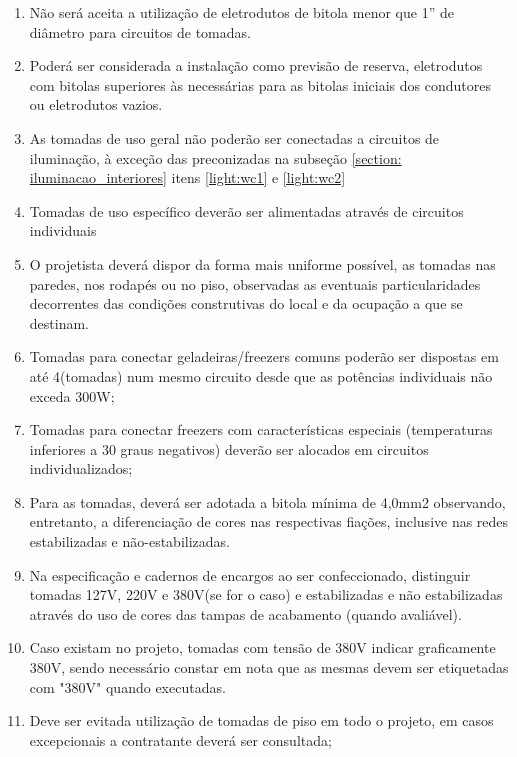 \begin{enumerate}
	\item Não será aceita a utilização de eletrodutos de bitola menor que 1” de diâmetro para circuitos de tomadas.
	
	\item Poderá ser considerada a instalação como previsão de reserva, eletrodutos com bitolas superiores às necessárias para as bitolas iniciais dos condutores ou eletrodutos vazios.
	
	\item As tomadas de uso geral não poderão ser conectadas a circuitos de iluminação, à exceção das preconizadas na subseção \ref{section: iluminacao_interiores} itens \ref*{light:wc1} e \ref*{light:wc2}
	 
	\item Tomadas de uso específico deverão ser alimentadas através de circuitos individuais
	
	\item O projetista deverá dispor da forma mais uniforme possível, as tomadas nas paredes, nos rodapés ou no piso, observadas as eventuais particularidades decorrentes das condições construtivas do local e da ocupação a que se destinam.

	\item Tomadas para conectar geladeiras/freezers comuns poderão ser dispostas em até 4(tomadas) num mesmo circuito desde que as potências individuais não exceda 300W;
	
	\item Tomadas para conectar freezers com características especiais (temperaturas inferiores a 30 graus negativos) deverão ser alocados em circuitos individualizados;

	\item Para as tomadas, deverá ser adotada a bitola mínima de 4,0mm2 observando, entretanto, a diferenciação de cores nas respectivas fiações, inclusive nas redes estabilizadas e não-estabilizadas.

	\item Na especificação e cadernos de encargos ao ser confeccionado, distinguir tomadas 127V, 220V e 380V(se for o caso) e estabilizadas e não estabilizadas através do uso de cores das tampas de acabamento (quando avaliável).
	
	\item Caso existam no projeto, tomadas com tensão de 380V indicar graficamente 380V, sendo necessário constar em nota que as mesmas devem ser etiquetadas com "380V" quando executadas.
	
	\item Deve ser evitada utilização de tomadas de piso em todo o projeto, em casos excepcionais a contratante deverá ser consultada;
	

\end{enumerate}
